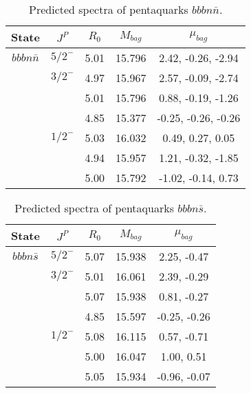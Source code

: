 \documentclass[prd,twocolumn,floatfix,nofootinbib]{revtex4}
\begin{document}
\renewcommand{\tabcolsep}{0.5cm}
\renewcommand{\arraystretch}{1.2}
\begin{table*}[!htbp]
    \caption{Predicted spectra of pentaquarks $bbbn\bar{n}$.}
    \begin{tabular}{ccccc}
        \hline\hline
        {\rm State} &$J^{P}$ &$R_{0}$ &$M_{bag}$ &$\mu_{bag}$ \\ \hline
        ${bbbn\bar{n}}$
            &${5/2}^{-}$    &5.01   &15.796 &2.42, -0.26, -2.94 \\
            &${3/2}^{-}$    &4.97   &15.967 &2.57, -0.09, -2.74 \\
            &               &5.01   &15.796 &0.88, -0.19, -1.26 \\
            &               &4.85   &15.377 &-0.25, -0.26, -0.26 \\
            &${1/2}^{-}$    &5.03   &16.032 &0.49, 0.27, 0.05 \\
            &               &4.94   &15.957 &1.21, -0.32, -1.85 \\
            &               &5.00   &15.792 &-1.02, -0.14, 0.73 \\
        \hline\hline
    \end{tabular}
\end{table*}

\renewcommand{\tabcolsep}{0.5cm}
\renewcommand{\arraystretch}{1.2}
\begin{table*}[!htbp]
    \caption{Predicted spectra of pentaquarks $bbbn\bar{s}$.}
    \begin{tabular}{ccccc}
        \hline\hline
        {\rm State} &$J^{P}$ &$R_{0}$ &$M_{bag}$ &$\mu_{bag}$ \\ \hline
        ${bbbn\bar{s}}$
            &${5/2}^{-}$    &5.07   &15.938 &2.25, -0.47 \\
            &${3/2}^{-}$    &5.01   &16.061 &2.39, -0.29 \\
            &               &5.07   &15.938 &0.81, -0.27 \\
            &               &4.85   &15.597 &-0.25, -0.26 \\
            &${1/2}^{-}$    &5.08   &16.115 &0.57, -0.71 \\
            &               &5.00   &16.047 &1.00, 0.51 \\
            &               &5.05   &15.934 &-0.96, -0.07 \\
        \hline\hline
    \end{tabular}
\end{table*}
\end{document}
